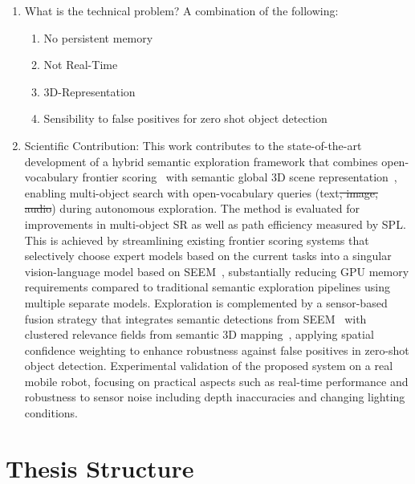 \begin{enumerate}
    \item What is the technical problem? A combination of the following:
    \begin{enumerate}
        \item No persistent memory
        \item Not Real-Time
        \item 3D-Representation
        \item Sensibility to false positives for zero shot object detection
    \end{enumerate}
    \item Scientific Contribution:
        This work contributes to the state-of-the-art development of a hybrid semantic exploration framework that combines open-vocabulary frontier scoring~\cite{yokoyama2024vlfm} with semantic global 3D scene representation~\cite{kashu2023openfusion}, enabling multi-object search with open-vocabulary queries (text\sout{, image, audio}) during autonomous exploration. The method is evaluated for improvements in multi-object \ac{SR} as well as path efficiency measured by \ac{SPL}. This is achieved by streamlining existing frontier scoring systems that selectively choose expert models based on the current tasks into a singular vision-language model based on \ac{SEEM}~\cite{zou2023seem}, substantially reducing GPU memory requirements compared to traditional semantic exploration pipelines using multiple separate models. Exploration is complemented by a sensor-based fusion strategy that integrates semantic detections from \ac{SEEM}~\cite{zou2023seem} with clustered relevance fields from semantic 3D mapping~\cite{kashu2023openfusion}, applying spatial confidence weighting to enhance robustness against false positives in zero-shot object detection. Experimental validation of the proposed system on a real mobile robot, focusing on practical aspects such as real-time performance and robustness to sensor noise including depth inaccuracies and changing lighting conditions.
\end{enumerate}

\section{Thesis Structure}

